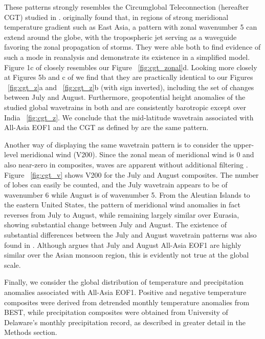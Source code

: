 	These patterns strongly resembles the Circumglobal Teleconnection (hereafter CGT) studied in \citet{Ding2005a}. \citet{Branstator2002} originally found that, in regions of strong meridional temperature gradient such as East Asia, a pattern with zonal wavenumber 5 can extend around the globe, with the tropospheric jet serving as a waveguide favoring the zonal propagation of storms. They were able both to find evidence of such a mode in reanalysis and demonstrate its existence in a simplified model. Figure 1c of \citet{Branstator2002} closely resembles our Figure ~\ref{fig:cgt_zonal}d. Looking more closely at Figures 5b and c of \citet{Ding2005a} we find that they are practically identical to our Figures ~\ref{fig:cgt_z}a and ~\ref{fig:cgt_z}b (with sign inverted), including the set of changes between July and August. Furthermore, geopotential height anomalies of the studied global wavetrains in both \citet{Branstator2002} and \citet{Ding2005a} are consistently barotropic except over India ~\ref{fig:cgt_z}. We conclude that the mid-latitude wavetrain associated with All-Asia EOF1 and the CGT as defined by \citet{Ding2005a} are the same pattern.
	
	Another way of displaying the same wavetrain pattern is to consider the upper-level meridional wind (V200). Since the zonal mean of meridional wind is 0 and also near-zero in composites, waves are apparent without additional filtering \citep{Branstator2002}. Figure ~\ref{fig:cgt_v} shows V200 for the July and August composites. The number of lobes can easily be counted, and the July wavetrain appears to be of wavenumber 6 while August is of wavenumber 5. From the Aleutian Islands to the eastern United States, the pattern of meridional wind anomalies in fact reverses from July to August, while remaining largely similar over Eurasia, showing substantial change between July and August. The existence of substantial differences between the July and August wavetrain patterns was also found in \citet{Ding2005a}. Although \citet{Day2015} argues that July and August All-Asia EOF1 are highly similar over the Asian monsoon region, this is evidently not true at the global scale.
	
	Finally, we consider the global distribution of temperature and precipitation anomalies associated with All-Asia EOF1. Positive and negative temperature composites were derived from detrended monthly temperature anomalies from BEST, while precipitation composites were obtained from University of Delaware's monthly precipitation record, as described in greater detail in the Methods section.

